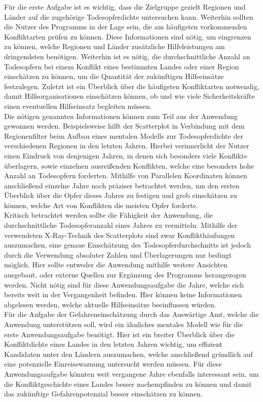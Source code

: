 \documentclass[usegeometry=true]{scrartcl}
\begin{document}
Für die erste Aufgabe ist es wichtig, dass die Zielgruppe gezielt Regionen und Länder auf die zugehörige Todesopferdichte untersuchen kann. Weiterhin sollten die Nutzer des Programms in der Lage sein, die am häufigsten vorkommenden Konfliktarten prüfen zu können. Diese Informationen sind nötig, um eingrenzen zu können, welche Regionen und Länder zusätzliche Hilfeleistungen am dringendsten benötigen. Weiterhin ist es nötig, die durchschnittliche Anzahl an Todesopfern bei einem Konflikt eines bestimmten Landes oder einer Region einschätzen zu können, um die Quantität der zukünftigen Hilfseinsätze festzulegen. Zuletzt ist ein Überblick über die häufigsten Konfliktarten notwendig, damit Hilfsorganisationen einschätzen können, ob und wie viele Sicherheitskräfte einen eventuellen Hilfseinsatz begleiten müssen.\\ Die nötigen genannten Informationen können zum Teil aus der Anwendung gewonnen werden. Beispielsweise hilft der Scatterplot in Verbindung mit dem Regionenfilter beim Aufbau eines mentalen Modells zur Todesopferdichte der verschiedenen Regionen in den letzten Jahren. Hierbei verinnerlicht der Nutzer einen Eindruck von denjenigen Jahren, in denen sich besonders viele Konflikte überlagern, sowie einzelnen \glqq ausreißenden\grqq{} Konflikten, welche eine besonders hohe Anzahl an Todesopfern forderten. Mithilfe von Parallelen Koordinaten können anschließend einzelne Jahre noch präziser betrachtet werden, um den ersten Überblick über die Opfer dieses Jahres zu festigen und grob einschätzen zu können, welche Art von Konflikten die meisten Opfer forderte.\\ Kritisch betrachtet werden sollte die Fähigkeit der Anwendung, die durchschnittliche Todesopferanzahl eines Jahres zu vermitteln. Mithilfe der verwendeten X-Ray-Technik des Scatterplots sind zwar Konflikthäufungen auszumachen, eine genaue Einschätzung des Todesopferdurchschnitts ist jedoch durch die Verwendung absoluter Zahlen und Überlagerungen nur bedingt möglich. Hier sollte entweder die Anwendung mithilfe weitere Ansichten ausgebaut, oder externe Quellen zur Ergänzung des Programms herangezogen werden. Nicht nötig sind für diese Anwendungsaufgabe die Jahre, welche sich bereits weit in der Vergangenheit befinden. Hier können keine Informationen abgelesen werden, welche aktuelle Hilfseinsätze beeinflussen würden.\\

Für die Aufgabe der Gefahreneinschätzung durch das Auswärtige Amt, welche die Anwendung unterstützen soll, wird ein ähnliches mentales Modell wie für die erste Anwendungsaufgabe benötigt. Hier ist ein breiter Überblick über die Konfliktdichte eines Landes in den letzten Jahren wichtig, um effizient Kandidaten unter den Ländern auszumachen, welche anschließend gründlich auf eine potenzielle Einreisewarnung untersucht werden müssen. Für diese Anwendungsaufgabe könnten weit vergangene Jahre ebenfalls interessant sein, um die Konfliktgeschichte eines Landes besser nachempfinden zu können und damit das zukünftige Gefahrenpotenzial besser einschätzen zu können.\\
\end{document}

